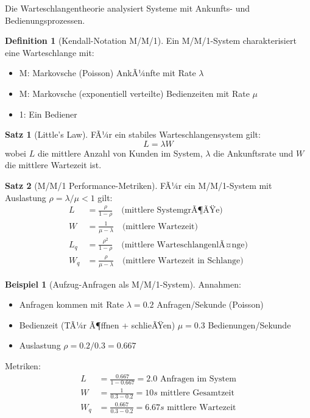 ﻿\documentclass[a4paper,12pt]{scrreprt}
\theoremstyle{definition}
\newtheorem{definition}{Definition}[section]
\newtheorem{beispiel}{Beispiel}[section]
\newtheorem{satz}{Satz}[section]
\begin{document}
Die Warteschlangentheorie \cite{kleinrock1975} analysiert Systeme mit Ankunfts- und Bedienungsprozessen.

\begin{definition}[Kendall-Notation M/M/1]
	Ein M/M/1-System charakterisiert eine Warteschlange mit:
	\begin{itemize}
		\item[-] M: Markovsche (Poisson) AnkÃ¼nfte mit Rate $\lambda$
		\item[-] M: Markovsche (exponentiell verteilte) Bedienzeiten mit Rate $\mu$
		\item[-] 1: Ein Bediener
	\end{itemize}
\end{definition}

\begin{satz}[Little's Law]
	FÃ¼r ein stabiles Warteschlangensystem gilt:
	\[
	L = \lambda W
	\]
	wobei $L$ die mittlere Anzahl von Kunden im System, $\lambda$ die Ankunftsrate und $W$ die mittlere Wartezeit ist.
\end{satz}

\begin{satz}[M/M/1 Performance-Metriken]
	FÃ¼r ein M/M/1-System mit Auslastung $\rho = \lambda/\mu < 1$ gilt:
	\begin{align}
		L &= \frac{\rho}{1-\rho} \quad \text{(mittlere SystemgrÃ¶ÃŸe)} \\
		W &= \frac{1}{\mu - \lambda} \quad \text{(mittlere Wartezeit)} \\
		L_q &= \frac{\rho^2}{1-\rho} \quad \text{(mittlere WarteschlangenlÃ¤nge)} \\
		W_q &= \frac{\rho}{\mu - \lambda} \quad \text{(mittlere Wartezeit in Schlange)}
	\end{align}
\end{satz}

\begin{beispiel}[Aufzug-Anfragen als M/M/1-System]
	Annahmen:
	\begin{itemize}
		\item[-] Anfragen kommen mit Rate $\lambda = 0.2$ Anfragen/Sekunde (Poisson)
		\item[-] Bedienzeit (TÃ¼r Ã¶ffnen + schlieÃŸen) $\mu = 0.3$ Bedienungen/Sekunde
		\item[-] Auslastung $\rho = 0.2/0.3 = 0.667$
	\end{itemize}
	
	Metriken:
	\begin{align*}
		L &= \frac{0.667}{1-0.667} = 2.0 \text{ Anfragen im System} \\
		W &= \frac{1}{0.3 - 0.2} = 10s \text{ mittlere Gesamtzeit} \\
		W_q &= \frac{0.667}{0.3 - 0.2} = 6.67s \text{ mittlere Wartezeit}
	\end{align*}
\end{beispiel}
\end{document}
